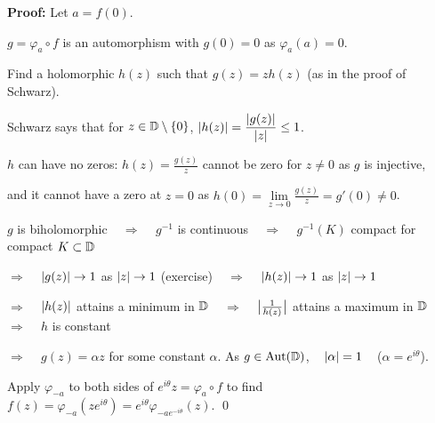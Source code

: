 \documentclass[10pt,aspectratio=169]{beamer}
\begin{document}
\begin{frame}
\textbf{Proof:}
Let $a = f(0)$.

\medskip
\pause

$g = \varphi_a \circ f$ is an automorphism with $g(0) = 0$ as
$\varphi_a(a) = 0$.

\medskip
\pause

Find a holomorphic $h(z)$ such that $g(z) = z h(z)$ (as in the proof of
Schwarz).

\medskip
\pause

Schwarz says that for $z \in {\mathbb{D}} \setminus \{ 0 \}$, \quad
$\lvert {h(z)} \rvert = \dfrac{\lvert {g(z)} \rvert}{\lvert {z} \rvert} \leq 1$.

\medskip
\pause

$h$ can have no zeros:
\pause
$h(z) = \frac{g(z)}{z}$ cannot be zero for $z \not= 0$ as $g$ is injective,

\pause
and it cannot have a zero at $z=0$
as $h(0) = \lim\limits_{z\to 0} \frac{g(z)}{z} = g'(0) \not= 0$.

\pause
\medskip

$g$ is biholomorphic
~ $\Rightarrow$ ~
$g^{-1}$ is continuous
\pause
~ $\Rightarrow$ ~
$g^{-1}(K)$ compact for compact $K \subset {\mathbb{D}}$

\medskip

\pause
$\Rightarrow$ ~
$\lvert {g(z)} \rvert \to 1$ as $\lvert {z} \rvert \to 1$ (exercise)
\pause
~ $\Rightarrow$ ~
$\lvert {h(z)} \rvert \to 1$ as $\lvert {z} \rvert \to 1$

\medskip
\pause

$\Rightarrow$ ~
$\lvert {h(z)} \rvert$ attains a minimum in ${\mathbb{D}}$
\pause
~ $\Rightarrow$ ~
$\bigl\lvert {\frac{1}{h(z)}} \bigr\rvert$ attains a maximum in ${\mathbb{D}}$
\pause
~ $\Rightarrow$ ~
$h$ is constant

\medskip
\pause

$\Rightarrow$ ~
$g(z) = \alpha z$ for some constant $\alpha$.
\pause
As $g \in \operatorname{Aut}({\mathbb{D}})$, ~
$\lvert {\alpha} \rvert = 1$ ~ ($\alpha = e^{i\theta}$).

\medskip
\pause

Apply $\varphi_{-a}$ to both sides of $e^{i\theta} z = \varphi_a \circ f$
to find
$f(z) = \varphi_{-a}(ze^{i\theta})
= e^{i \theta} \varphi_{-ae^{-i\theta}}(z)$.
\qed

\end{frame}
\end{document}
